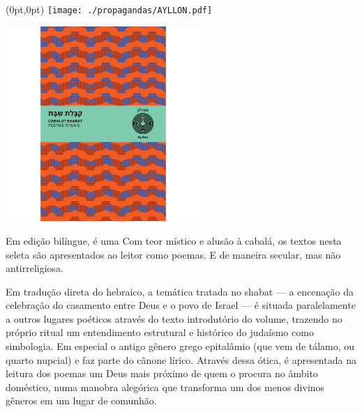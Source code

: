 \pagestyle{ayllon}
\label{ayllon}


\begin{textblock*}{5.625in}(0pt,0pt)%
\vspace*{-3.49cm}
\hspace*{-2.76cm}\texttt{[image: ./propagandas/AYLLON.pdf]}
\end{textblock*}

\pagebreak %

\begin{center}
\hspace*{.5cm}\includegraphics[width=74mm]{./grid/cabalat.png}
\end{center}

\hspace*{-7cm}\hrulefill\hspace*{-7cm}

\medskip

\noindent{}Em edição bilíngue, {} é uma  Com teor místico e alusão à cabalá, os textos nesta seleta são apresentados ao leitor como poemas. E de maneira secular, mas não antirreligiosa.

Em tradução direta do hebraico, a temática tratada no shabat --- a encenação da celebração do casamento entre Deus e o povo de Israel --- é situada paralelamente a outros lugares poéticos através do texto introdutório do volume, trazendo no próprio ritual um entendimento estrutural e histórico do judaísmo como simbologia. Em especial o antigo gênero grego epitalâmio (que vem de tálamo, ou quarto nupcial) e faz parte do cânone lírico. Através dessa ótica, é apresentada na leitura dos poemas um Deus mais próximo de quem o procura no âmbito doméstico, numa manobra alegórica que transforma um dos menos divinos gêneros em um lugar de comunhão.


